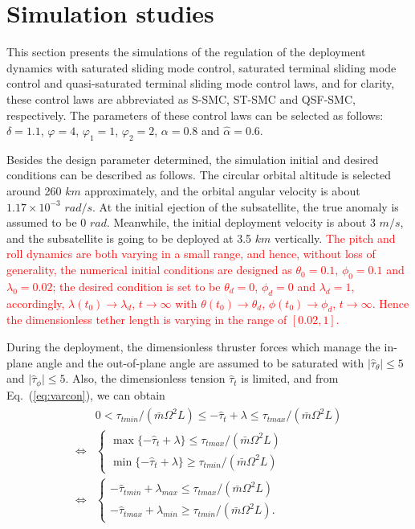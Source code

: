 \documentclass[3p]{elsarticle}
\theoremstyle{plain}
\theoremstyle{remark}
\begin{document}
\section{Simulation studies}\label{sec:4}
This section presents the simulations of the regulation of the deployment dynamics with saturated sliding mode control, saturated terminal sliding mode control and quasi-saturated terminal sliding mode control laws, and for clarity, these control laws are abbreviated as S-SMC, ST-SMC and QSF-SMC, respectively. The parameters of these control laws can be selected as follows: $\delta=1.1$, $\varphi= 4$, $\varphi_1 = 1$, $\varphi_2= 2$, $\alpha = 0.8$ and $\hat\alpha=0.6$.\par
Besides the design parameter determined, the simulation initial and desired conditions can be described as follows. The circular orbital altitude is selected around 260 $km$ approximately, and the orbital angular velocity is about $1.17\times 10^{-3}$ $rad/s$. At the initial ejection of the subsatellite, the true anomaly is assumed to be 0 $rad$. Meanwhile, the initial deployment velocity is about 3 $m/s$, and the subsatellite is going to be deployed at 3.5 $km$ vertically. \textcolor{red}{The pitch and roll dynamics are both varying in a small range, and hence, without loss of generality, the numerical initial conditions are designed as $\theta_0 = 0.1$, $\phi_0 = 0.1$ and $\lambda_0 = 0.02$; the desired condition is set to be $\theta_d = 0$, $\phi_d = 0$ and $\lambda_d = 1$, accordingly, $\lambda(t_0)\rightarrow\lambda_d$, $t\rightarrow\infty$ with $\theta(t_0)\rightarrow\theta_d$, $\phi(t_0)\rightarrow\phi_d$, $t\rightarrow\infty$. Hence the dimensionless tether length is varying in the range of $[0.02,1]$.}\par
During the deployment, the dimensionless thruster forces which manage the in-plane angle and the out-of-plane angle are assumed to be saturated with $\vert\hat\tau_{\theta}\vert\le5 $ and $\vert\hat\tau_{\phi}\vert\le 5$. Also, the dimensionless tension $\hat\tau_t$ is limited, and from Eq.~(\ref{eq:varcon}), we can obtain
\begin{align}
\begin{split}
&0<\tau_{tmin}/(\bar{m}\Omega^2L)\le-\hat\tau_t+\lambda\le\tau_{tmax}/(\bar{m}\Omega^2L)\\
\Leftrightarrow
&\begin{cases}
\max\{-\hat\tau_t+\lambda\}\le\tau_{tmax}/(\bar{m}\Omega^2L)\\
\min\{-\hat\tau_t+\lambda\}\ge\tau_{tmin}/(\bar{m}\Omega^2L)
\end{cases}\\
\Leftrightarrow
&\begin{cases}
-\hat\tau_{tmin}+\lambda_{max}\le\tau_{tmax}/(\bar{m}\Omega^2L)\\
-\hat\tau_{tmax}+\lambda_{min}\ge\tau_{tmin}/(\bar{m}\Omega^2L).
\end{cases}
\end{split}
\end{align}
\end{document}
